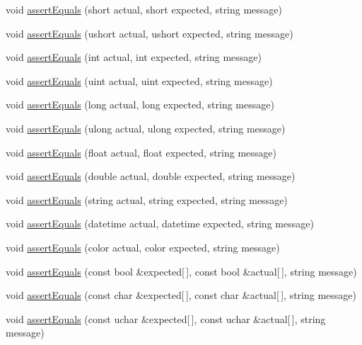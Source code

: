 \begin{DoxyCompactItemize}
void \mbox{\hyperlink{class_m_t_unit_a3e4631314d9541570caecf94f171bf86}{assert\+Equals}} (short actual, short expected, string message)
\item 
void \mbox{\hyperlink{class_m_t_unit_afb16a1e7cd6da69426eed6077b09e345}{assert\+Equals}} (ushort actual, ushort expected, string message)
\item 
void \mbox{\hyperlink{class_m_t_unit_a52809992f236d526649345607300578f}{assert\+Equals}} (int actual, int expected, string message)
\item 
void \mbox{\hyperlink{class_m_t_unit_a4f4dcab7c86fb9dac429e652d929cc48}{assert\+Equals}} (uint actual, uint expected, string message)
\item 
void \mbox{\hyperlink{class_m_t_unit_af60409d2750fb2ae0d3b0a32c475a3b0}{assert\+Equals}} (long actual, long expected, string message)
\item 
void \mbox{\hyperlink{class_m_t_unit_a561341e348d842808630857f662c5b46}{assert\+Equals}} (ulong actual, ulong expected, string message)
\item 
void \mbox{\hyperlink{class_m_t_unit_a7870b6a845def77ba72750417be38da6}{assert\+Equals}} (float actual, float expected, string message)
\item 
void \mbox{\hyperlink{class_m_t_unit_a4c034b46096ff7d378a00c24d15def01}{assert\+Equals}} (double actual, double expected, string message)
\item 
void \mbox{\hyperlink{class_m_t_unit_ab7b8a4b1fd0155d1e4ead57190b42b25}{assert\+Equals}} (string actual, string expected, string message)
\item 
void \mbox{\hyperlink{class_m_t_unit_aa6144c96b64b7023fd40cc28c36b4fdb}{assert\+Equals}} (datetime actual, datetime expected, string message)
\item 
void \mbox{\hyperlink{class_m_t_unit_a7307f24c9947d9197de4a57fddac5f03}{assert\+Equals}} (color actual, color expected, string message)
\item 
void \mbox{\hyperlink{class_m_t_unit_a9986024867ae7bd3dc91498a5adfaca5}{assert\+Equals}} (const bool \&expected\mbox{[}$\,$\mbox{]}, const bool \&actual\mbox{[}$\,$\mbox{]}, string message)
\item 
void \mbox{\hyperlink{class_m_t_unit_a98b770960e7de4a307e66e9516320eb8}{assert\+Equals}} (const char \&expected\mbox{[}$\,$\mbox{]}, const char \&actual\mbox{[}$\,$\mbox{]}, string message)
\item 
void \mbox{\hyperlink{class_m_t_unit_a2e881f961b6b85d908e47a632f0daa26}{assert\+Equals}} (const uchar \&expected\mbox{[}$\,$\mbox{]}, const uchar \&actual\mbox{[}$\,$\mbox{]}, string message)

\end{DoxyCompactItemize}
